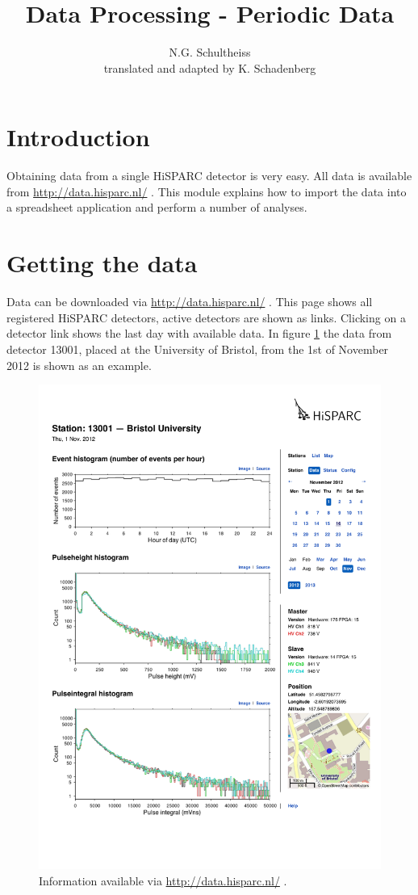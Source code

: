 \documentclass[12pt,a4paper]{article}
\author{N.G. Schultheiss \\ translated and adapted by K. Schadenberg}
\date{}
\title{Data Processing - Periodic Data}
\numberwithin{equation}{section}
\numberwithin{figure}{section}
\numberwithin{table}{section}
\begin{document}
\maketitle

\section{Introduction}
Obtaining data from a single HiSPARC detector is very easy. All data is available from \url{http://data.hisparc.nl/} . This module explains how to import the data into a spreadsheet application and perform a number of analyses.

\section{Getting the data}
Data can be downloaded via \url{http://data.hisparc.nl/} . This page shows all registered HiSPARC detectors, active detectors are shown as links. Clicking on a detector link shows the last day with available data. In figure \ref{fig:data_screen} the data from detector 13001, placed at the University of Bristol, from the 1st of November 2012 is shown as an example.

\begin{figure}\begin{center}
\includegraphics[scale=0.6]{Data_HiSPARC_Station_13001.pdf}
\caption{Information available via \protect\url{http://data.hisparc.nl/} .}\label{fig:data_screen}
\end{center}\end{figure}
\end{document}
